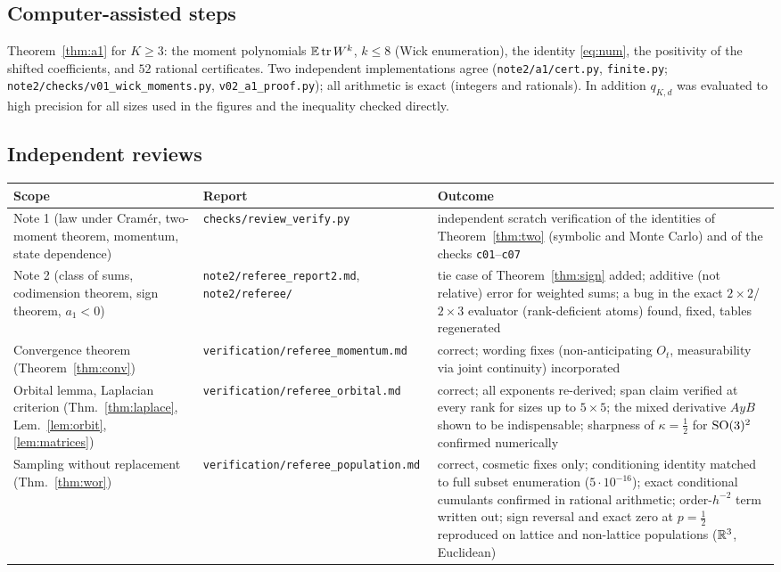 \subsection{Computer-assisted steps}
Theorem~\ref{thm:a1} for $K\ge3$: the moment polynomials $\mathbb{E}\operatorname{tr} W^k$, $k\le8$ (Wick enumeration), the identity
\eqref{eq:num}, the positivity of the shifted coefficients, and $52$ rational certificates. Two independent
implementations agree (\texttt{note2/a1/cert.py}, \texttt{finite.py}; \texttt{note2/checks/v01\_wick\_moments.py},
\texttt{v02\_a1\_proof.py}); all arithmetic is exact (integers and rationals). In addition $q_{K,d}$ was evaluated to
high precision for all sizes used in the figures and the inequality checked directly.

\subsection{Independent reviews}
\begin{center}\small
\begin{tabular}{@{}p{}p{}p{}@{}}
\toprule
Scope & Report & Outcome\\
\midrule
Note 1 (law under Cram\'er, two-moment theorem, momentum, state dependence) & \texttt{checks/review\_verify.py} &
independent scratch verification of the identities of Theorem~\ref{thm:two} (symbolic and Monte Carlo) and of the checks \texttt{c01}--\texttt{c07}\\
Note 2 (class of sums, codimension theorem, sign theorem, $a_1<0$) & \texttt{note2/referee\_report2.md}, \texttt{note2/referee/} &
tie case of Theorem~\ref{thm:sign} added; additive (not relative) error for weighted sums; a bug in the exact
$2\times2$/$2\times3$ evaluator (rank-deficient atoms) found, fixed, tables regenerated\\
Convergence theorem (Theorem~\ref{thm:conv}) & \texttt{verification/referee\_momentum.md} &
correct; wording fixes (non-anticipating $O_t$, measurability via joint continuity) incorporated\\
Orbital lemma, Laplacian criterion (Thm.~\ref{thm:laplace}, Lem.~\ref{lem:orbit}, \ref{lem:matrices}) &
\texttt{verification/referee\_orbital.md} & correct; all exponents re-derived; span claim verified at every rank for sizes up to
$5\times5$; the mixed derivative $AyB$ shown to be indispensable; sharpness of $\kappa=\frac12$ for $\mathrm{SO}(3)^2$ confirmed numerically\\
Sampling without replacement (Thm.~\ref{thm:wor}) & \texttt{verification/referee\_population.md} & correct, cosmetic fixes only; conditioning identity matched to full subset enumeration ($5\cdot10^{-16}$); exact conditional cumulants confirmed in rational arithmetic; order-$h^{-2}$ term written out; sign reversal and exact zero at $p=\frac12$ reproduced on lattice and non-lattice populations ($\mathbb{R}^3$, Euclidean)\\
\bottomrule
\end{tabular}
\end{center}

